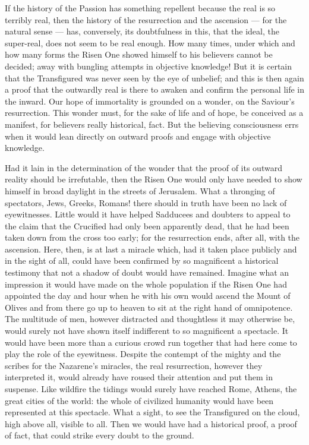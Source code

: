 \documentclass[12pt,a4paper,openany]{book}
\newcommand{\opage}[1]{\marginnote{\footnotesize\textit{[#1]}}}
\begin{document}
If the history of the Passion has something repellent because the real is so terribly real, then the
history of the resurrection
\setcounter{footnote}{0}%
\opage{84}and the ascension --- for the natural sense --- has, conversely, its doubtfulness in this, that
the ideal, the super-real, does not seem to be real enough. How many times, under which and how many
forms the Risen One showed himself to his believers cannot be decided; away with bungling attempts in
objective knowledge! But it is certain that the Transfigured was never seen by the eye of unbelief; and
this is then again a proof that the outwardly real is there to awaken and confirm the personal life in
the inward. Our hope of immortality is grounded on a wonder, on the Saviour's resurrection. This wonder
must, for the sake of life and of hope, be conceived as a manifest, for believers really historical,
fact. But the believing consciousness errs when it would lean directly on outward proofs and engage
with objective knowledge.

Had it lain in the determination of the wonder that the proof of its outward reality should be
irrefutable, then the Risen One would only have needed to show himself in broad daylight in the streets
of Jerusalem. What a thronging of spectators, Jews, Greeks, Romans! there should in truth have been no
lack of eyewitnesses. Little would it have helped Sadducees and doubters to appeal to the claim that the
Crucified had only been apparently dead, that he had been taken down from the cross too early; for the
resurrection ends, after all, with the ascension. Here, then, is at last a miracle which, had it taken
place publicly and in the sight of all, could have been confirmed by so magnificent a historical
testimony that not a shadow of doubt would have remained. Imagine what an impression it would have made
on the whole population if the Risen One had appointed the day and hour
\setcounter{footnote}{0}%
\opage{85}when he with his own would ascend the Mount of Olives and from there go up to heaven to sit at
the right hand of omnipotence. The multitude of men, however distracted and thoughtless it may otherwise
be, would surely not have shown itself indifferent to so magnificent a spectacle. It would have been more
than a curious crowd run together that had here come to play the role of the eyewitness. Despite the
contempt of the mighty and the scribes for the Nazarene's miracles, the real resurrection, however they
interpreted it, would already have roused their attention and put them in suspense. Like wildfire the
tidings would surely have reached Rome, Athens, the great cities of the world: the whole of civilized
humanity would have been represented at this spectacle. What a sight, to see the Transfigured on the
cloud, high above all, visible to all. Then we would have had a historical proof, a proof of fact, that
could strike every doubt to the ground.
\end{document}

